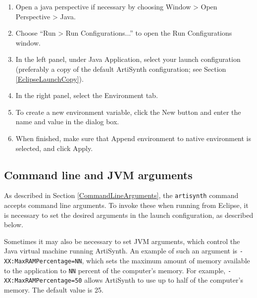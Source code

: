 \begin{enumerate}

\item Open a java perspective if necessary by choosing
  {\sf Window > Open Perspective > Java}.

\item Choose ``{\sf Run > Run Configurations...}'' to open the {\sf Run
  Configurations} window.

\item In the left panel, under {\sf Java Application}, select 
your launch configuration (preferably a copy of the default {\sf
ArtiSynth} configuration; see Section \ref{EclipseLaunchCopy}).

\item In the right panel, select the {\sf Environment} tab.

\item To create a new environment variable, click the {\sf New} button and
  enter the name and value in the dialog box. 

\item When finished, make sure that {\sf Append environment to native
  environment} is selected, and click {\sf Apply}.

\end{enumerate}


\subsection{Command line and JVM arguments}
\label{EclipseCommandArguments}

As described in Section \ref{CommandLineArguments}, the {\tt artisynth}
command accepts command line arguments. To invoke these when
running from Eclipse, it is necessary to set the desired arguments in
the launch configuration, as described below. 

Sometimes it may also be necessary to set JVM arguments, which control
the Java virtual machine running ArtiSynth.  An example of such an
argument is {\tt -XX:MaxRAMPercentage=NN}, which sets the maximum
amount of memory available to the application to {\tt NN} percent of
the computer's memory.  For example, {\tt -XX:MaxRAMPercentage=50}
allows ArtiSynth to use up to half of the computer's memory. The
default value is 25.

